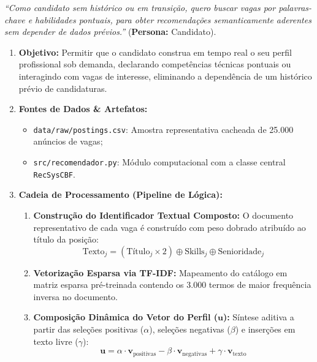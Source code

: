 \begin{tcolorbox}[userstorybox, title={User Story Vinculada (Aba 2)}]
\textit{``Como candidato sem histórico ou em transição, quero buscar vagas por palavras-chave e habilidades pontuais, para obter recomendações semanticamente aderentes sem depender de dados prévios.''} (\textbf{Persona:} Candidato).
\end{tcolorbox}

\begin{enumerate}[label=\textbf{\arabic*.}]
    \item \textbf{Objetivo:} Permitir que o candidato construa em tempo real o seu perfil profissional sob demanda, declarando competências técnicas pontuais ou interagindo com vagas de interesse, eliminando a dependência de um histórico prévio de candidaturas.
    \item \textbf{Fontes de Dados \& Artefatos:}
    \begin{itemize}
        \item \texttt{data/raw/postings.csv}: Amostra representativa cacheada de 25.000 anúncios de vagas;
        \item \texttt{src/recomendador.py}: Módulo computacional com a classe central \texttt{RecSysCBF}.
    \end{itemize}
    \item \textbf{Cadeia de Processamento (Pipeline de Lógica):}
    \begin{enumerate}[label=\alph*)]
        \item \textbf{Construção do Identificador Textual Composto:} O documento representativo de cada vaga é construído com peso dobrado atribuído ao título da posição:
        \begin{equation}
            \text{Texto}_j = (\text{Título}_j \times 2) \oplus \text{Skills}_j \oplus \text{Senioridade}_j
        \end{equation}
        \item \textbf{Vetorização Esparsa via TF-IDF:} Mapeamento do catálogo em matriz esparsa pré-treinada contendo os 3.000 termos de maior frequência inversa no documento.
        \item \textbf{Composição Dinâmica do Vetor do Perfil ($\mathbf{u}$):} Síntese aditiva a partir das seleções positivas ($\alpha$), seleções negativas ($\beta$) e inserções em texto livre ($\gamma$):
        \begin{equation}
            \mathbf{u} = \alpha \cdot \mathbf{v}_{\text{positivas}} - \beta \cdot \mathbf{v}_{\text{negativas}} + \gamma \cdot \mathbf{v}_{\text{texto}}

\end{equation}
\end{enumerate}
\end{enumerate}
